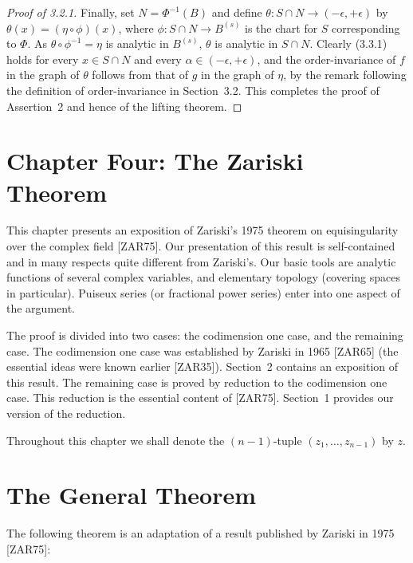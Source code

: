 \documentclass[11pt]{article}
\theoremstyle{plain}
\theoremstyle{definition}
\begin{document}
\begin{proof}[Proof of 3.2.1]
Finally, set $N = \Phi^{-1}(B)$ and define
$\theta : S \cap N \to (-\epsilon, +\epsilon)$ by
$\theta(x) = (\eta \circ \phi)(x)$, where $\phi : S \cap N \to B^{(s)}$
is the chart for $S$ corresponding to $\Phi$. As
$\theta \circ \phi^{-1} = \eta$ is analytic in $B^{(s)}$, $\theta$ is
analytic in $S \cap N$. Clearly (3.3.1) holds for every
$x \in S \cap N$ and every $\alpha \in (-\epsilon, +\epsilon)$, and
the order-invariance of $f$ in the graph of $\theta$ follows from that
of $g$ in the graph of $\eta$, by the remark following the definition
of order-invariance in Section~3.2. This completes the proof of
Assertion~2 and hence of the lifting theorem.
\end{proof}

\newpage

\section*{Chapter Four: The Zariski Theorem}

This chapter presents an exposition of Zariski's 1975 theorem on
equisingularity over the complex field [ZAR75]. Our presentation of
this result is self-contained and in many respects quite different
from Zariski's. Our basic tools are analytic functions of several
complex variables, and elementary topology (covering spaces in
particular). Puiseux series (or fractional power series) enter into
one aspect of the argument.

The proof is divided into two cases: the codimension one case, and the
remaining case. The codimension one case was established by Zariski in
1965 [ZAR65] (the essential ideas were known earlier [ZAR35]).
Section~2 contains an exposition of this result. The remaining case
is proved by reduction to the codimension one case. This reduction is
the essential content of [ZAR75]. Section~1 provides our version of
the reduction.

Throughout this chapter we shall denote the $(n-1)$-tuple
$(z_1, \ldots, z_{n-1})$ by $z$.

\section{The General Theorem}

The following theorem is an adaptation of a result published by
Zariski in 1975 [ZAR75]:
\end{document}
